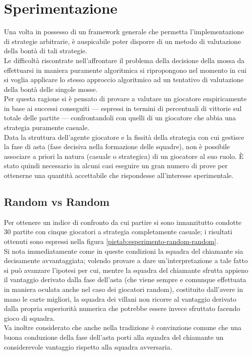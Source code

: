 \chapter*{Sperimentazione}
\graphicspath{{Chapter6/Chapter6Figs/PNG/}{Chapter6/Chapter6Figs/PDF/}{Chapter6/Chapter6Figs/}}

Una volta in possesso di un framework generale che permetta l'implementazione di strategie arbitrarie, è auspicabile poter disporre di un metodo di valutazione della bontà di tali strategie.\\
Le difficoltà riscontrate nell'affrontare il problema della decisione della mossa da effettuarsi in maniera puramente algoritmica si ripropongono nel momento in cui si voglia applicare lo stesso approccio algoritmico ad un tentativo di valutazione della bontà delle singole mosse.\\
Per questa ragione si è pensato di provare a valutare un giocatore empiricamente in base ai successi conseguiti --- espressi in termini di percentuali di vittorie sul totale delle partite ---  confrontandoli con quelli di un giocatore che abbia una strategia puramente casuale.\\
Data la struttura dell'agente giocatore e la fissità della strategia con cui gestisce la fase di asta (fase decisiva nella formazione delle squadre), non è possibile associare a priori la natura (casuale o strategica) di un giocatore al suo ruolo. È stato quindi necessario in alcuni casi eseguire un gran numero di prove per ottenerne una quantità accettabile che rispondesse all'interesse sperimentale.


\section{Random vs Random}

Per ottenere un indice di confronto da cui partire si sono innanzitutto condotte 30 partite con cinque giocatori a strategia completamente casuale; i risultati ottenuti sono espressi nella figura \ref{pietab:esperimento-random-random}.\\
Si nota immediatamente come in queste condizioni la squadra del chiamante sia decisamente avvantaggiata; volendo provare a dare un'interpretazione a tale fatto si può avanzare l'ipotesi per cui, mentre la squadra del chiamante sfrutta appieno il vantaggio derivato dalla fase dell'asta (che viene sempre e comunque effettuata in maniera oculata anche nel caso dei giocatori random), costituito dall'avere in mano le carte migliori, la squadra dei villani non ricorre al vantaggio derivato dalla propria superiorità numerica che potrebbe essere invece sfruttato facendo gioco di squadra.\\
Va inoltre considerato che anche nella tradizione è convinzione comune che una buona conduzione della fase dell'asta porti alla squadra del chiamante un considerevole vantaggio rispetto alla squadra avversaria.

